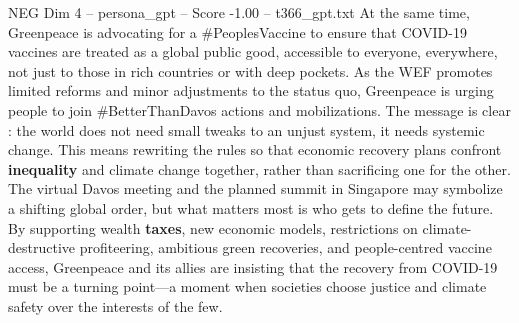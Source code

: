 \begin{textsample}{NEG Dim 4 – persona\_gpt – Score -1.00 – t366\_gpt.txt}
At the same time, Greenpeace is advocating for a \#PeoplesVaccine to ensure that COVID-19 vaccines are treated as a global public good, accessible to everyone, everywhere, not just to those in rich countries or with deep pockets.
As the WEF promotes limited reforms and minor adjustments to the status quo, Greenpeace is urging people to join \#BetterThanDavos actions and mobilizations.
The message is clear : the world does not need small tweaks to an unjust system, it needs systemic change.
This means rewriting the rules so that economic recovery plans confront \textbf{inequality} and climate change together, rather than sacrificing one for the other.
The virtual Davos meeting and the planned summit in Singapore may symbolize a shifting global order, but what matters most is who gets to define the future.
By supporting wealth \textbf{taxes}, new economic models, restrictions on climate-destructive profiteering, ambitious green recoveries, and people-centred vaccine access, Greenpeace and its allies are insisting that the recovery from COVID-19 must be a turning point—a moment when societies choose justice and climate safety over the interests of the few.

\end{textsample}
